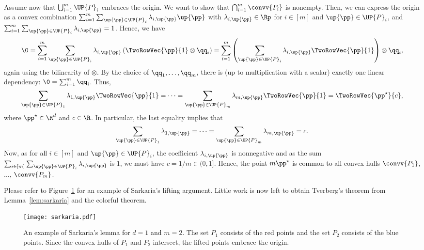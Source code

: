 \begin{prf}
Assume now that $\bigcup_{i=1}^m \UP{P}_i$ embraces the origin. 
We want to show that $\bigcap_{i=1}^m \convv{P_i}$ is nonempty. 
Then, we can express the origin as a convex combination $\sum_{i=1}^{m}
\sum_{\up{\pp} \in \UP{P}_i} \lambda_{i,\up{\pp}} \up{\pp}$ with
$\lambda_{i,\up{\pp}} \in\Rp$ for $i \in
[m]$ and $\up{\pp} \in \UP{P}_i$, and $\sum_{i=1}^{m} \sum_{\up{\pp} \in
\UP{P}_i} \lambda_{i,\up{\pp}} = 1$. Hence, we have
\[
\0 = \sum_{i=1}^{m} \sum_{\up{\pp} \in \UP{P}_i} \lambda_{i,\up{\pp}}
\left( \TwoRowVec{\pp}{1} \otimes \qq_i \right)
 = \sum_{i=1}^{m} \left( \sum_{\up{\pp} \in \UP{P}_i} \lambda_{i,\up{\pp}}
 \TwoRowVec{\pp}{1} \right) \otimes \qq_i,
\]
again using the bilinearity of $\otimes$.
By the choice of $\qq_1,\dots,\qq_m$, there is (up to multiplication 
with a scalar) exactly one linear dependency: $\0 = \sum_{i=1}^{m} \qq_i$.
Thus,
\[
\sum_{\up{\pp} \in \UP{P}_1} \lambda_{1,\up{\pp}} \TwoRowVec{\pp}{1}
= \dots =
\sum_{\up{\pp} \in \UP{P}_m} \lambda_{m,\up{\pp}} \TwoRowVec{\pp}{1} =
\TwoRowVec{\pp^\star}{c},
\]
where $\pp^\star \in \R^d$ and $c \in \R$. In particular, the last equality
implies that
\[
\sum_{\up{\pp} \in \UP{P}_1} \lambda_{1,\up{\pp}}
= \dots =
\sum_{\up{\pp} \in \UP{P}_m} \lambda_{m,\up{\pp}}
= c.
\]
Now, as for all $i \in [m]$ and $\up{\pp} \in \UP{P}_i$, the coefficient
$\lambda_{i,\up{\pp}}$ is nonnegative and as the sum $\sum_{i \in [m]}
\sum_{\up{\pp} \in \UP{P}_i} \lambda_{i,\up{\pp}}$ is $1$, we must have 
$c = 1/m \in (0,1]$. Hence,
the point $m \pp^\star$ is common to all convex
hulls $\convv{P_1}$, $\ldots$, $\convv{P_m}$.
\end{prf}

Please refer to Figure~\ref{fig:sarkaria} for an example of Sarkaria's 
lifting argument.  Little work is now left to obtain Tverberg's theorem 
from Lemma~\ref{lem:sarkaria} and the colorful \Caratheodory theorem.
\begin{figure}[htbp]
  \begin{center}
    \texttt{[image: sarkaria.pdf]}
  \end{center}
  \caption[Example of Sarkaria's Lemma.]{An example of Sarkaria's lemma for
  $d=1$ and $m=2$. The set $P_1$
  consists of the red points and the set $P_2$ consists of the blue points.
  Since the convex hulls of $P_1$ and $P_2$ intersect, the lifted points 
  embrace the origin.}
  \label{fig:sarkaria}
\end{figure}

